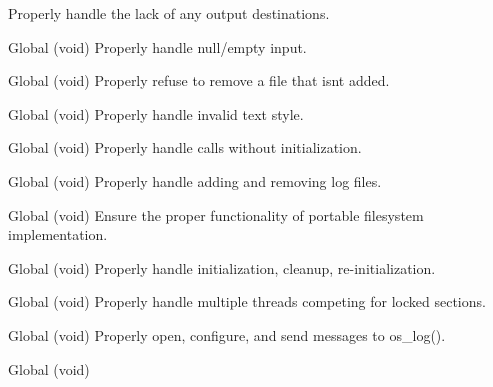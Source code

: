 \begin{DoxyRefList}
%
Properly handle the lack of any output destinations.  
\item[Global \doxylink{group__tests_gade87411ddfc55756dd519d7e9b8f33a7}{sirtest\+\_\+failnulls} (void)]\label{test__test000008}%
%
Properly handle null/empty input.  
\item[Global \doxylink{group__tests_ga73504bc15f794cbf70dff785136672bb}{sirtest\+\_\+failremovebadfile} (void)]\label{test__test000014}%
%
Properly refuse to remove a file that isn\textquotesingle{}t added.  
\item[Global \doxylink{group__tests_gaf0b4eb59c772e4b6fa9a694252a1db2d}{sirtest\+\_\+failsetinvalidstyle} (void)]\label{test__test000004}%
%
Properly handle invalid text style.  
\item[Global \doxylink{group__tests_ga4f238c5ad2114b9a746e64b003165bd1}{sirtest\+\_\+failwithoutinit} (void)]\label{test__test000009}%
%
Properly handle calls without initialization.  
\item[Global \doxylink{group__tests_ga47f8191761084c5b3673b0efac0197d0}{sirtest\+\_\+filecachesanity} (void)]\label{test__test000003}%
%
Properly handle adding and removing log files.  
\item[Global \doxylink{group__tests_gaa0b035b71e6a6e6df6b8a7bb95722e2a}{sirtest\+\_\+filesystem} (void)]\label{test__test000022}%
%
Ensure the proper functionality of portable filesystem implementation.  
\item[Global \doxylink{group__tests_ga9f7ccc25d41c5980dae048951ba60c8b}{sirtest\+\_\+initcleanupinit} (void)]\label{test__test000012}%
%
Properly handle initialization, cleanup, re-\/initialization.  
\item[Global \doxylink{group__tests_ga33e3ca313f107bfad6d01c00c9d47d8d}{sirtest\+\_\+mthread\+\_\+race} (void)]\label{test__test000001}%
%
Properly handle multiple threads competing for locked sections.  
\item[Global \doxylink{group__tests_ga54f0e8e0163d0aedf20616451f122017}{sirtest\+\_\+os\+\_\+log} (void)]\label{test__test000021}%
%
Properly open, configure, and send messages to os\+\_\+log(). 
\item[Global \doxylink{group__tests_ga607e96cb52e248a2277ab3ecc31b7195}{sirtest\+\_\+perf} (void)]\label{test__test000018}%

\end{DoxyRefList}
